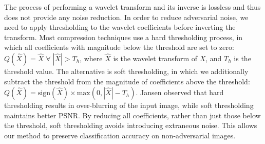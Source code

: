 The process of performing a wavelet transform and its inverse is lossless and thus does not provide any noise reduction.
In order to reduce adversarial noise, we need to apply thresholding to the wavelet coefficients before inverting the transform.
Most compression techniques use a hard thresholding process, in which all coefficients with magnitude below the threshold are set to zero: $Q(\hat{X}) = \hat{X} \; \forall \; |\hat{X}| > T_h$, where $\hat{X}$ is the wavelet transform of $X$, and $T_h$ is the threshold value.
The alternative is soft thresholding, in which we additionally subtract the threshold from the magnitude of coefficients above the threshold: $Q(\hat{X}) = \text{sign}(\hat{X})\times \text{max}(0,|\hat{X}| - T_h)$.
Jansen \etal \cite{ThresholdingJansen2012noise} observed that hard thresholding results in over-blurring of the input image, while soft thresholding maintains better PSNR.
By reducing all coefficients, rather than just those below the threshold, soft thresholding avoids introducing extraneous noise.
This allows our method to preserve classification accuracy on non-adversarial images.


